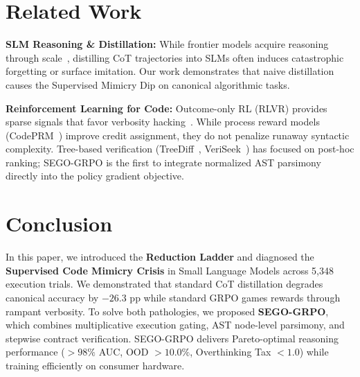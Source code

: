\documentclass[10pt,twocolumn,letterpaper]{article}
\begin{document}
\section{Related Work}
\label{sec:related}

\textbf{SLM Reasoning \& Distillation:} While frontier models acquire reasoning through scale~\cite{deepseekai2025deepseekr1}, distilling CoT trajectories into SLMs often induces catastrophic forgetting or surface imitation. Our work demonstrates that naive distillation causes the Supervised Mimicry Dip on canonical algorithmic tasks.

\textbf{Reinforcement Learning for Code:} Outcome-only RL (RLVR) provides sparse signals that favor verbosity hacking~\cite{shao2024deepseekmath}. While process reward models (CodePRM~\cite{codeprm2025}) improve credit assignment, they do not penalize runaway syntactic complexity. Tree-based verification (TreeDiff~\cite{treediff2025}, VeriSeek~\cite{veriseek2025}) has focused on post-hoc ranking; SEGO-GRPO is the first to integrate normalized AST parsimony directly into the policy gradient objective.

\section{Conclusion}
\label{sec:conclusion}

In this paper, we introduced the \textbf{Reduction Ladder} and diagnosed the \textbf{Supervised Code Mimicry Crisis} in Small Language Models across 5,348 execution trials. We demonstrated that standard CoT distillation degrades canonical accuracy by $-26.3$ pp while standard GRPO games rewards through rampant verbosity. To solve both pathologies, we proposed \textbf{SEGO-GRPO}, which combines multiplicative execution gating, AST node-level parsimony, and stepwise contract verification. SEGO-GRPO delivers Pareto-optimal reasoning performance ($>98\%$ AUC, OOD $>10.0\%$, Overthinking Tax $<1.0$) while training efficiently on consumer hardware.



\end{document}
